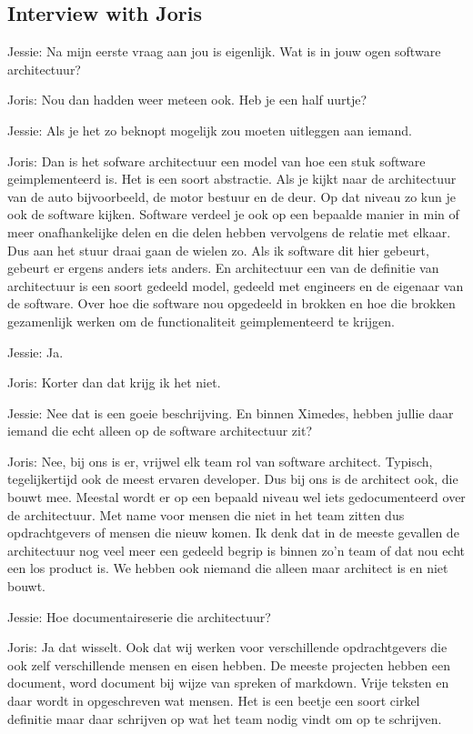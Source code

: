 \subsection{Interview with Joris}

Jessie: Na mijn eerste vraag aan jou is eigenlijk. Wat is in jouw ogen software architectuur?

Joris: Nou dan hadden weer meteen ook. Heb je een half uurtje?

Jessie: Als je het zo beknopt mogelijk zou moeten uitleggen aan iemand.

Joris: Dan is het sofware architectuur een model van hoe een stuk software geimplementeerd is. Het is een soort abstractie. Als je kijkt naar de architectuur van de auto bijvoorbeeld, de motor bestuur en de deur. Op dat niveau zo kun je ook de software kijken. Software verdeel je ook op een bepaalde manier in min of meer onafhankelijke delen en die delen hebben vervolgens de relatie met elkaar. Dus aan het stuur draai gaan de wielen zo. Als ik software dit hier gebeurt, gebeurt er ergens anders iets anders. En architectuur een van de definitie van architectuur is een soort gedeeld model, gedeeld met engineers en de eigenaar van de software. Over hoe die software nou opgedeeld in brokken en hoe die brokken gezamenlijk werken om de functionaliteit geimplementeerd te krijgen.

Jessie: Ja.

Joris: Korter dan dat krijg ik het niet.

Jessie: Nee dat is een goeie beschrijving. En binnen Ximedes, hebben jullie daar iemand die echt alleen op de software architectuur zit?

Joris: Nee, bij ons is er, vrijwel elk team rol van software architect. Typisch, tegelijkertijd ook de meest ervaren developer. Dus bij ons is de architect ook, die bouwt mee. Meestal wordt er op een bepaald niveau wel iets gedocumenteerd over de architectuur. Met name voor mensen die niet in het team zitten dus opdrachtgevers of mensen die nieuw komen. Ik denk dat in de meeste gevallen de architectuur nog veel meer een gedeeld begrip is binnen zo'n team of dat nou echt een los product is. We hebben ook niemand die alleen maar architect is en niet bouwt.

Jessie: Hoe documentaireserie die architectuur?

Joris: Ja dat wisselt. Ook dat wij werken voor verschillende opdrachtgevers die ook zelf verschillende mensen en eisen hebben. De meeste projecten hebben een document, word document bij wijze van spreken of markdown. Vrije teksten en daar wordt in opgeschreven wat mensen. Het is een beetje een soort cirkel definitie maar daar schrijven op wat het team nodig vindt om op te schrijven.

